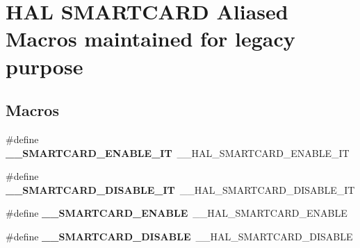 \hypertarget{group___h_a_l___s_m_a_r_t_c_a_r_d___aliased___macros}{\section{H\-A\-L S\-M\-A\-R\-T\-C\-A\-R\-D Aliased Macros maintained for legacy purpose}
\label{group___h_a_l___s_m_a_r_t_c_a_r_d___aliased___macros}
}
\subsection*{Macros}
\begin{DoxyCompactItemize}
\item 
\hypertarget{group___h_a_l___s_m_a_r_t_c_a_r_d___aliased___macros_ga8d5d23bc871cf5aef481120b55f7ac9f}{\#define {\bfseries \-\_\-\-\_\-\-S\-M\-A\-R\-T\-C\-A\-R\-D\-\_\-\-E\-N\-A\-B\-L\-E\-\_\-\-I\-T}~\-\_\-\-\_\-\-H\-A\-L\-\_\-\-S\-M\-A\-R\-T\-C\-A\-R\-D\-\_\-\-E\-N\-A\-B\-L\-E\-\_\-\-I\-T}\label{group___h_a_l___s_m_a_r_t_c_a_r_d___aliased___macros_ga8d5d23bc871cf5aef481120b55f7ac9f}

\item 
\hypertarget{group___h_a_l___s_m_a_r_t_c_a_r_d___aliased___macros_ga86c309a6a3c0780c7847062466aaf4cc}{\#define {\bfseries \-\_\-\-\_\-\-S\-M\-A\-R\-T\-C\-A\-R\-D\-\_\-\-D\-I\-S\-A\-B\-L\-E\-\_\-\-I\-T}~\-\_\-\-\_\-\-H\-A\-L\-\_\-\-S\-M\-A\-R\-T\-C\-A\-R\-D\-\_\-\-D\-I\-S\-A\-B\-L\-E\-\_\-\-I\-T}\label{group___h_a_l___s_m_a_r_t_c_a_r_d___aliased___macros_ga86c309a6a3c0780c7847062466aaf4cc}

\item 
\hypertarget{group___h_a_l___s_m_a_r_t_c_a_r_d___aliased___macros_gaa4e29e98414736502d7ee2371481d9f6}{\#define {\bfseries \-\_\-\-\_\-\-S\-M\-A\-R\-T\-C\-A\-R\-D\-\_\-\-E\-N\-A\-B\-L\-E}~\-\_\-\-\_\-\-H\-A\-L\-\_\-\-S\-M\-A\-R\-T\-C\-A\-R\-D\-\_\-\-E\-N\-A\-B\-L\-E}\label{group___h_a_l___s_m_a_r_t_c_a_r_d___aliased___macros_gaa4e29e98414736502d7ee2371481d9f6}

\item 
\hypertarget{group___h_a_l___s_m_a_r_t_c_a_r_d___aliased___macros_ga7765cb32d89b868ca5e775e7b6a571c7}{\#define {\bfseries \-\_\-\-\_\-\-S\-M\-A\-R\-T\-C\-A\-R\-D\-\_\-\-D\-I\-S\-A\-B\-L\-E}~\-\_\-\-\_\-\-H\-A\-L\-\_\-\-S\-M\-A\-R\-T\-C\-A\-R\-D\-\_\-\-D\-I\-S\-A\-B\-L\-E}\label{group___h_a_l___s_m_a_r_t_c_a_r_d___aliased___macros_ga7765cb32d89b868ca5e775e7b6a571c7}


\end{DoxyCompactItemize}
